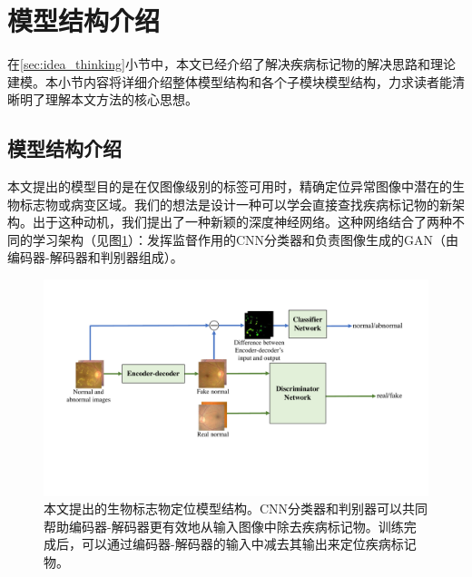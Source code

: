 \section{模型结构介绍}\label{sec:model_architecture_intro}
在\ref{sec:idea_thinking}小节中，本文已经介绍了解决疾病标记物的解决思路和理论建模。本小节内容将详细介绍整体模型结构和各个子模块模型结构，力求读者能清晰明了理解本文方法的核心思想。


\subsection{模型结构介绍}\label{subsec:model_architecture}
本文提出的模型目的是在仅图像级别的标签可用时，精确定位异常图像中潜在的生物标志物或病变区域。我们的想法是设计一种可以学会直接查找疾病标记物的新架构。出于这种动机，我们提出了一种新颖的深度神经网络。这种网络结合了两种不同的学习架构（见图\ref{fig:our_model_architecture}）：发挥监督作用的CNN分类器和负责图像生成的GAN（由编码器-解码器和判别器组成）。

\begin{figure}[h]
	\centering
	\includegraphics[width=1.0\textwidth]{figure/method.pdf}
	\caption{本文提出的生物标志物定位模型结构。CNN分类器和判别器可以共同帮助编码器-解码器更有效地从输入图像中除去疾病标记物。训练完成后，可以通过编码器-解码器的输入中减去其输出来定位疾病标记物。} 
	\label{fig:our_model_architecture}
\end{figure}

